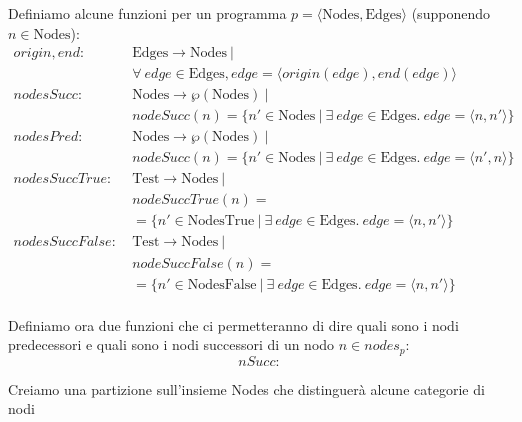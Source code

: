 \documentclass{article}
\begin{document}
Definiamo alcune funzioni per un programma \(p=\langle\textrm{Nodes}, \textrm{Edges}\rangle\) (supponendo \(n \in\textrm{Nodes}\)):
\begin{align*}
origin,end :\ &\textrm{Edges}\rightarrow\textrm{Nodes}\ | \\
&\forall\ edge\in\textrm{Edges}, edge=\langle origin(edge), end(edge)\rangle \\
nodesSucc :\ &\textrm{Nodes}\rightarrow\wp(\textrm{Nodes})\ | \\
&nodeSucc(n)=\{n'\in\textrm{Nodes}\ |\ \exists\ edge\in\textrm{Edges}.\ edge=\langle n, n'\rangle\} \\
nodesPred :\ &\textrm{Nodes}\rightarrow\wp(\textrm{Nodes})\ | \\
&nodeSucc(n)=\{n'\in\textrm{Nodes}\ |\ \exists\ edge\in\textrm{Edges}.\ edge=\langle n', n\rangle\} \\
nodesSuccTrue :\ &\textrm{Test}\rightarrow\textrm{Nodes}\ | \\
&nodeSuccTrue(n)=\\
&=\{n'\in\textrm{NodesTrue}\ |\ \exists\ edge\in\textrm{Edges}.\ edge=\langle n, n'\rangle\} \\
nodesSuccFalse :\ &\textrm{Test}\rightarrow\textrm{Nodes}\ | \\
&nodeSuccFalse(n)=\\
&=\{n'\in\textrm{NodesFalse}\ |\ \exists\ edge\in\textrm{Edges}.\ edge=\langle n, n'\rangle\} \\
\end{align*}


Definiamo ora due funzioni che ci permetteranno di dire quali sono i nodi predecessori e quali sono i nodi successori di un nodo \(n\in nodes_p\):
\[nSucc:\]

Creiamo una partizione sull'insieme Nodes che distinguerà alcune categorie di nodi
\end{document}
